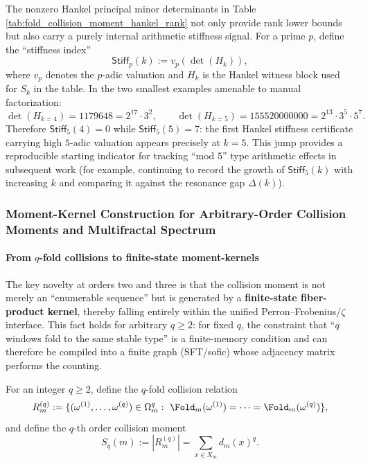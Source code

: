 \begin{remark}[\texorpdfstring{$p$}{p}-adic stiffness fingerprint: \texorpdfstring{$p=5$}{p=5} first appears explicitly in the Hankel certificate at \texorpdfstring{$k=5$}{k=5}]\label{rem:pom-hankel-stiffness-p5}
The nonzero Hankel principal minor determinants in Table \ref{tab:fold_collision_moment_hankel_rank} not only provide rank lower bounds but also carry a purely internal arithmetic stiffness signal.
For a prime \(p\), define the ``stiffness index''
\[
\mathsf{Stiff}_p(k):=v_p(\det(H_k)),
\]
where \(v_p\) denotes the \(p\)-adic valuation and \(H_k\) is the Hankel witness block used for \(S_k\) in the table.
In the two smallest examples amenable to manual factorization:
\[
\det(H_{k=4})=1179648=2^{17}\cdot 3^2,
\qquad
\det(H_{k=5})=155520000000=2^{13}\cdot 3^5\cdot 5^7.
\]
Therefore \(\mathsf{Stiff}_5(4)=0\) while \(\mathsf{Stiff}_5(5)=7\): the first Hankel stiffness certificate carrying high \(5\)-adic valuation appears precisely at \(k=5\).
This jump provides a reproducible starting indicator for tracking ``mod \(5\)'' type arithmetic effects in subsequent work (for example, continuing to record the growth of \(\mathsf{Stiff}_5(k)\) with increasing \(k\) and comparing it against the resonance gap \(\Delta(k)\)).
\end{remark}

\subsubsection{Moment-Kernel Construction for Arbitrary-Order Collision Moments and Multifractal Spectrum}\label{subsec:pom-moment-general}

\paragraph{From \texorpdfstring{$q$}{q}-fold collisions to finite-state moment-kernels}
The key novelty at orders two and three is that the collision moment is not merely an ``enumerable sequence'' but is generated by a \textbf{finite-state fiber-product kernel}, thereby falling entirely within the unified Perron--Frobenius/\(\zeta\) interface.
This fact holds for arbitrary \(q\ge 2\): for fixed \(q\), the constraint that ``\(q\) windows fold to the same stable type'' is a finite-memory condition and can therefore be compiled into a finite graph (SFT/sofic) whose adjacency matrix performs the counting.

\begin{definition}\label{def:pom-moment-q}
For an integer \(q\ge 2\), define the \(q\)-fold collision relation
$$
R_m^{(q)}:=
\{(\omega^{(1)},\dots,\omega^{(q)})\in\Omega_m^q:\ \Fold_m(\omega^{(1)})=\cdots=\Fold_m(\omega^{(q)})\},
$$
and define the \(q\)-th order collision moment
$$
S_q(m):=|R_m^{(q)}|=\sum_{x\in X_m} d_m(x)^q.
$$
\end{definition}

